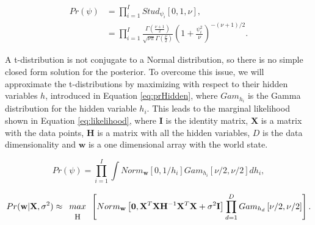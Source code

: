 \documentclass[12pt]{article}
\begin{document}
\begin{equation}
\begin{split}
\label{eq:prior}
Pr(\psi) &= \prod_{i = 1}^{I} Stud_{\psi_i} [0, 1, \nu],\\
&= \prod_{i=1}^I \frac{\Gamma \left( \frac{\nu + 1}{2} \right)}{ \sqrt{\nu \pi} \Gamma \left(\frac{\nu}{2} \right) } \left( 1 + \frac{\psi^2_i}{\nu} \right)^{- (\nu+1)/2}.
\end{split}
\end{equation}

A t-distribution is not conjugate to a Normal distribution, so there is no simple closed form solution for the posterior.
To overcome this issue, we  will approximate the t-distributions by maximizing with respect to their hidden variables $h$, introduced in Equation \ref{eq:prHidden}, where $Gam_{h_i}$ is the Gamma distribution for the hidden variable $h_i$.
This leads to the marginal likelihood shown in Equation \ref{eq:likelihood}, where $\mathbf{I}$ is the identity matrix, $\mathbf{X}$ is a matrix with the data points, $\mathbf{H}$ is a matrix with all the hidden variables, $D$ is the data dimensionality and $\mathbf{w}$ is a one dimensional array with the world state.

\begin{equation}
\label{eq:prHidden}
Pr(\psi) = \prod_{i = 1}^{I} \int Norm_{\mathbf{w}}[0,1/h_i] Gam_{h_i}[\nu/2, \nu/2] dh_i,
\end{equation}

\begin{equation}
\label{eq:likelihood}
Pr(\mathbf{w}|\mathbf{X},\sigma^2) \approx \begin{array}{c}
		\\
      max \\
      \mathbf{ \mbox{\small H} }
    \end{array} \left[ Norm_{\mathbf{w}} \left[ \mathbf{0}, \mathbf{X}^T \mathbf{X} \mathbf{H}^{-1} \mathbf{X}^T \mathbf{X} + \sigma^2 \mathbf{I} \right] \prod_{d =1}^D Gam_{h_d} \left[ \nu /2, \nu/2 \right]  \right].
\end{equation}
\end{document}
